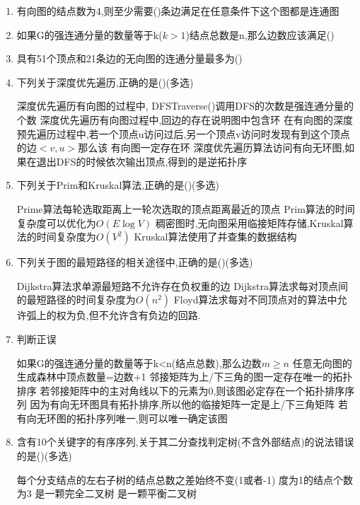 \documentclass[12pt, a4paper, oneside, UTF8]{ctexbook}
\begin{document}
\begin{enumerate}
    \item 有向图的结点数为4,则至少需要(\qquad)条边满足在任意条件下这个图都是连通图
    \item 如果G的强连通分量的数量等于k($k > 1$)结点总数是n,那么边数应该满足(\qquad)
    \item 具有51个顶点和21条边的无向图的连通分量最多为(\qquad)
    \item 下列关于深度优先遍历,正确的是(\qquad)(多选)
    \begin{choices}[1]
        \task 深度优先遍历有向图的过程中, DFSTraverse()调用DFS的次数是强连通分量的个数
        \task 深度优先遍历有向图过程中,回边的存在说明图中包含环
        \task 在有向图的深度预先遍历过程中,若一个顶点u访问过后,另一个顶点v访问时发现有到这个顶点的边$<v,u>$那么该
        有向图一定存在环
        \task 深度优先遍历算法访问有向无环图,如果在退出DFS的时候依次输出顶点,得到的是逆拓扑序
    \end{choices}
    \item 下列关于Prim和Kruskal算法,正确的是(\qquad)(多选)
    \begin{choices}[1]
        \task Prime算法每轮选取距离上一轮次选取的顶点距离最近的顶点
        \task Prim算法的时间复杂度可以优化为$O(E\log{V})$
        \task 稠密图时,无向图采用临接矩阵存储,Kruskal算法的时间复杂度为$O(V^2)$
        \task Kruskal算法使用了并查集的数据结构
    \end{choices}
    \item 下列关于图的最短路径的相关途径中,正确的是(\qquad)(多选)
    \begin{choices}[1]
        \task Dijkstra算法求单源最短路不允许存在负权重的边
        \task Dijkstra算法求每对顶点间的最短路径的时间复杂度为$O(n^2)$
        \task Floyd算法求每对不同顶点对的算法中允许弧上的权为负,但不允许含有负边的回路.
    \end{choices}
    \item 判断正误
    \begin{choices}[1]
        \task 如果G的强连通分量的数量等于k<n(结点总数),那么边数$m\geq n$
        \task 任意无向图的生成森林中顶点数量=边数+1
        \task 邻接矩阵为上/下三角的图一定存在唯一的拓扑排序
        \task 若邻接矩阵中的主对角线以下的元素为0,则该图必定存在一个拓扑排序序列
        \task 因为有向无环图具有拓扑排序,所以他的临接矩阵一定是上/下三角矩阵 
        \task 若有向无环图的拓扑序列唯一,则可以唯一确定该图
    \end{choices}

    \item 含有10个关键字的有序序列,关于其二分查找判定树(不含外部结点)的说法错误的是(\qquad)(多选)
    \begin{choices}
        \task 每个分支结点的左右子树的结点总数之差始终不变(1或者-1)
        \task 度为1的结点个数为3
        \task 是一颗完全二叉树
        \task 是一颗平衡二叉树
    \end{choices}


\end{enumerate}
\end{document}
